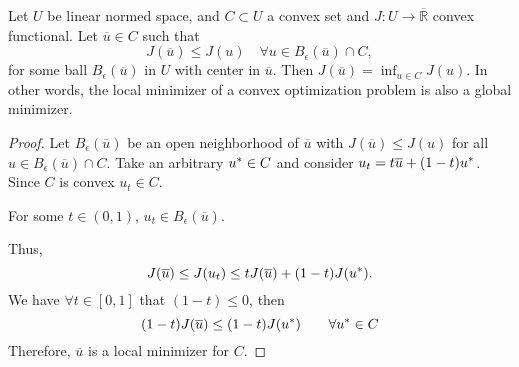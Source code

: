 \begin{lemma}
Let $U$ be linear normed space, and $C\subset U$ a convex set and $J: U \rightarrow \overline{\mathbb{R}}$ convex functional. Let $\overline{u} \in C$ such that
\[
	J(\overline{u}) \leq J(u) \quad \forall u \in B_\epsilon(\overline{u}) \cap C,
\] 
for some ball $B_\epsilon(\overline{u})$ in $U$ with center in $\overline{u}$. Then $J(\overline{u})=\inf_{u\in C} J(u)$.  In other words, the local minimizer of a convex optimization problem is also a global minimizer.
	\begin{proof}
		Let $B_\epsilon(\overline{u})$ be an open neighborhood of $\overline{u}$ with $J(\overline{u})\leq J(u)$ for all $u \in B_\epsilon(\overline{u})\cap C$.
		Take an arbitrary ${u}^{\ast} \in C $ and consider $u_t = t \overline{u}+(1-t){u}^{\ast}$. Since $C$ is convex $u_t \in C$.
		
		For some $t\in(0,1)$, $u_t \in B_\epsilon(\overline{u})$.
		
		Thus, \[J(\overline{u})\leq J(u_t) \leq t J(\overline{u})+(1-t)J({u}^{\ast}).\]
		We have $\forall t \in [0, 1]$ that $(1-t)\leq 0$, then
		\[
			(1-t) J(\overline{u}) \leq (1-t) J({u}^{\ast}) \qquad \forall {u}^{\ast} \in C
		\]
		Therefore, $\overline{u}$ is a local minimizer for $C$.
	\end{proof}
\end{lemma}
